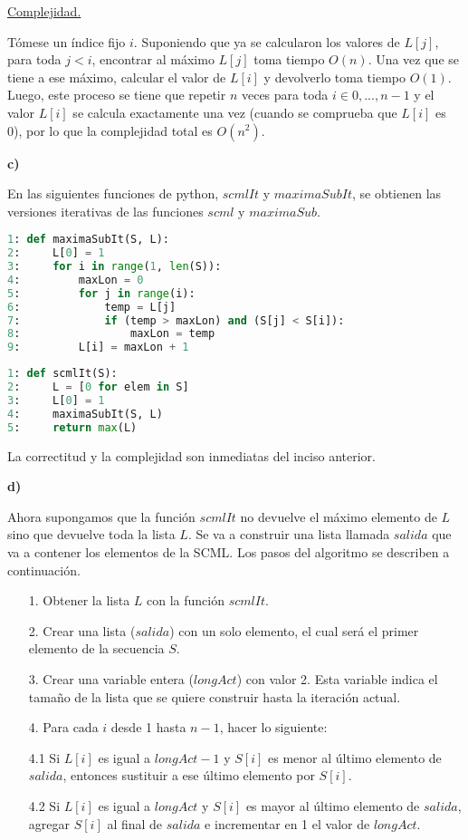 \documentclass{article}
\begin{document}
\underline{Complejidad.}

Tómese un índice fijo $i$. Suponiendo que ya se calcularon los valores de $L[j]$, para toda $j<i$, encontrar al máximo $L[j]$ toma tiempo
$O(n)$. Una vez que se tiene a ese máximo, calcular el valor de $L[i]$ y devolverlo toma tiempo $O(1)$. Luego, este proceso se tiene
que repetir $n$ veces para toda $i \in {0, ..., n-1}$ y el valor $L[i]$ se calcula exactamente una vez
(cuando se comprueba que $L[i]$ es 0), por lo que la complejidad total es $O(n^2)$.

\textbf{c)}

En las siguientes funciones de python, $scmlIt$ y $maximaSubIt$, se obtienen las versiones iterativas
de las funciones $scml$ y $maximaSub$.

\begin{lstlisting}[language=Python]
1: def maximaSubIt(S, L):
2:     L[0] = 1
3:     for i in range(1, len(S)):
4:         maxLon = 0
5:         for j in range(i):
6:             temp = L[j]
7:             if (temp > maxLon) and (S[j] < S[i]):
8:                 maxLon = temp
9:         L[i] = maxLon + 1
\end{lstlisting}

\begin{lstlisting}[language=Python]
1: def scmlIt(S):
2:     L = [0 for elem in S]
3:     L[0] = 1
4:     maximaSubIt(S, L)
5:     return max(L)
\end{lstlisting}

La correctitud y la complejidad son inmediatas del inciso anterior.

\textbf{d)}

Ahora supongamos que la función $scmlIt$ no devuelve el máximo elemento de $L$ sino que devuelve toda la lista $L$.
Se va a construir una lista llamada $salida$ que va a contener los elementos de la SCML.
Los pasos del algoritmo se describen a continuación.

\begin{itemize}
    \item[1.] Obtener la lista $L$ con la función $scmlIt$.
    \item[2.] Crear una lista ($salida$) con un solo elemento, el cual será el primer elemento de la secuencia $S$.
    \item[3.] Crear una variable entera ($longAct$) con valor 2. Esta variable indica el tamaño de la lista que se quiere construir hasta la iteración actual.
    \item[4.] Para cada $i$ desde 1 hasta $n-1$, hacer lo siguiente:
    \item[4.1] Si $L[i]$ es igual a $longAct-1$ y $S[i]$ es menor al último elemento de $salida$, entonces sustituir a ese último elemento por $S[i]$.
    \item[4.2] Si $L[i]$ es igual a $longAct$ y $S[i]$ es mayor al último elemento de $salida$, agregar $S[i]$ al final de $salida$ e incrementar en 1 el valor de $longAct$.
\end{itemize}
\end{document}
